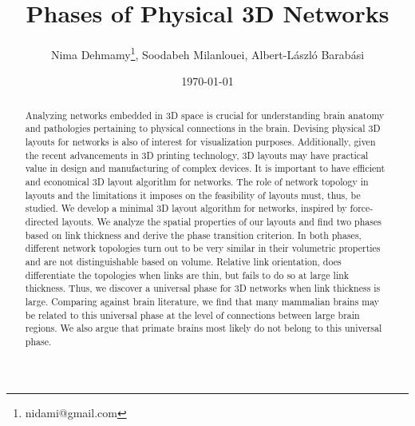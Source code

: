 \documentclass[nofootinbib,preprint,floatfix]{revtex4} %
\begin{document}
\title{Phases of Physical 3D Networks}
\author{Nima Dehmamy\thanks{nidami@gmail.com}, Soodabeh Milanlouei, Albert-L\'aszl\'o Barab\'asi}
\date{\today}

\begin{abstract}
Analyzing networks embedded in 3D space is crucial for understanding brain anatomy and pathologies pertaining to physical connections in the brain. 
Devising physical 3D layouts for networks is also of interest for  visualization purposes.
Additionally, given the recent advancements in 3D printing technology, 3D layouts may have practical value in design and manufacturing of complex devices. 
It is important to have efficient and economical 3D layout algorithm for networks. 
The role of network topology in layouts and the limitations it imposes on the feasibility of layouts must, thus, be studied.
We develop a minimal 3D layout algorithm for networks, inspired by force-directed layouts. 
We analyze the spatial properties of our layouts and find two phases based on link thickness and derive the phase transition criterion.  
In both phases, different network topologies turn out to be very similar in their volumetric properties and are not distinguishable based on volume. 
Relative link orientation, does differentiate the topologies when links are thin, but fails to do so at large link thickness. 
Thus, we discover a universal phase for 3D networks when link thickness is large.
Comparing against brain literature, we find that many mammalian brains may be related to this universal phase at the level of connections between large brain regions.  
We also argue that primate brains most likely do not belong to this universal phase. 
\end{abstract}

\maketitle


\end{document}
